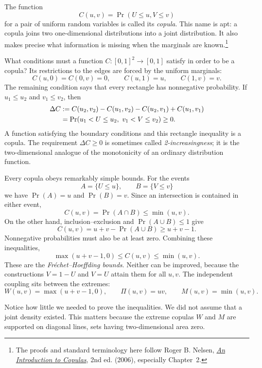 The function
\[
 C(u,v)=\Pr(U\leq u,V\leq v)
\]
for a pair of uniform random variables is called its \emph{copula}. This name is apt: a copula joins two one-dimensional distributions into a joint distribution. It also makes precise what information is missing when the marginals are known.\footnote{The proofs and standard terminology here follow Roger B. Nelsen, \href{https://doi.org/10.1007/0-387-28678-0}{\emph{An Introduction to Copulas}}, 2nd ed. (2006), especially Chapter~2.}

What conditions must a function \(C:[0,1]^2\to[0,1]\) satisfy in order to be a copula? Its restrictions to the edges are forced by the uniform marginals:
\begin{equation}
 C(u,0)=C(0,v)=0,\qquad
 C(u,1)=u,\qquad C(1,v)=v.
 \label{eq:N20261105-copula-boundaries}
\end{equation}
The remaining condition says that every rectangle has nonnegative probability. If \(u_1\leq u_2\) and \(v_1\leq v_2\), then
\begin{align}
 \Delta C
 &:=C(u_2,v_2)-C(u_1,v_2)
   -C(u_2,v_1)+C(u_1,v_1)\notag\\
 &=\Pr(u_1<U\leq u_2,\ v_1<V\leq v_2)\geq0.
 \label{eq:N20261105-rectangle}
\end{align}
A function satisfying the boundary conditions and this rectangle inequality is a copula. The requirement \(\Delta C\geq0\) is sometimes called \emph{2-increasingness}; it is the two-dimensional analogue of the monotonicity of an ordinary distribution function.

Every copula obeys remarkably simple bounds. For the events
\[
 A=\{U\leq u\},\qquad B=\{V\leq v\}
\]
we have \(\Pr(A)=u\) and \(\Pr(B)=v\). Since an intersection is contained in either event,
\[
 C(u,v)=\Pr(A\cap B)\leq\min(u,v).
\]
On the other hand, inclusion--exclusion and \(\Pr(A\cup B)\leq1\) give
\[
 C(u,v)=u+v-\Pr(A\cup B)\geq u+v-1.
\]
Nonnegative probabilities must also be at least zero. Combining these inequalities,
\begin{equation}
 \boxed{\max(u+v-1,0)\leq C(u,v)\leq\min(u,v).}
 \label{eq:N20261105-FH}
\end{equation}
These are the \emph{Fr\'echet--Hoeffding bounds}. Neither can be improved, because the constructions \(V=1-U\) and \(V=U\) attain them for all \(u,v\). The independent coupling sits between the extremes:
\[
 W(u,v)=\max(u+v-1,0),\qquad
 \Pi(u,v)=uv,\qquad
 M(u,v)=\min(u,v).
\]

Notice how little we needed to prove the inequalities. We did not assume that a joint density existed. This matters because the extreme copulas \(W\) and \(M\) are supported on diagonal lines, sets having two-dimensional area zero.

